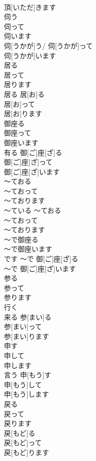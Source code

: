 \documentclass[8pt]{extreport}
\begin{document}
\begin{CJK}{UTF8}{min}
\\	頂[いただ]きます	
\\	伺う 
\\	伺って 
\\	伺います	
\\	伺[うかが]う/ 伺[うかが]って 
\\	伺[うかが]います	
\\	居る 
\\	居って 
\\	居ります 
\\	居る	居[お]る 
\\	居[お]って 
\\	居[お]ります	
\\	御座る 
\\	御座って 
\\	御座います	
\\	有る	御[ご]座[ざ]る 
\\	御[ご]座[ざ]って 
\\	御[ご]座[ざ]います	
\\	〜ておる 
\\	〜ておって 
\\	〜ております	
\\	〜ている	〜ておる 
\\	〜ておって 
\\	〜ております	
\\	〜で御座る 
\\	〜で御座います	
\\	です	〜で 御[ご]座[ざ]る 
\\	〜で 御[ご]座[ざ]います	
\\	参る 
\\	参って 
\\	参ります	
\\	行く 
\\	来る	参[まい]る 
\\	参[まい]って 
\\	参[まい]ります	
\\	申す 
\\	申して 
\\	申します	
\\	言う	申[もう]す 
\\	申[もう]して 
\\	申[もう]します	
\\	戻る 
\\	戻って 
\\	戻ります	
\\	戻[もど]る 
\\	戻[もど]って 
\\	戻[もど]ります	

\end{CJK}
\end{document}
